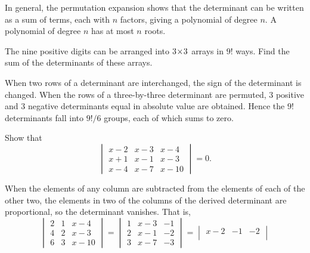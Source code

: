 \begin{exercises}
\begin{answer}
      In general, the permutation expansion shows that
      the determinant can be written as a sum of terms, each
      with \( n \) factors, giving a polynomial of degree $n$.
      A polynomial of degree \( n \) has at most \( n \) roots. 
    \end{answer}
  \puzzle \item 
    The nine positive digits can be arranged into \( 3 \! \times \! 3 \) arrays
    in \( 9! \) ways.
    Find the sum of the determinants of these arrays.
    \cite{MathMag63Q307}
    \begin{answer}
      \answerasgiven
      When two rows of a determinant are interchanged, the sign of the
      determinant is changed.
      When the rows of a three-by-three determinant are permuted, \( 3 \)
      positive and \( 3 \) negative determinants equal in absolute value
      are obtained.
      Hence the \( 9! \) determinants fall into \( 9!/6 \) groups, each of
      which sums to zero.  
    \end{answer}
  \item 
    Show that
    \begin{equation*}
      \begin{vmatrix}
        x-2  &x-3  &x-4  \\
        x+1  &x-1  &x-3  \\
        x-4  &x-7  &x-10
      \end{vmatrix}=0.
    \end{equation*}
    \cite{MathMag63Q237}
    \begin{answer}
      \answerasgiven
      When the elements of any column are subtracted from the elements of
      each of the other two, the elements in two of the columns of the derived
      determinant are proportional, so the determinant vanishes.
      That is,
      \begin{equation*}
        \begin{vmatrix}
          2  &1    &x-4  \\
          4  &2    &x-3  \\
          6  &3    &x-10
        \end{vmatrix}=
        \begin{vmatrix}
          1    &x-3  &-1   \\
          2    &x-1  &-2   \\
          3    &x-7  &-3
        \end{vmatrix}=
        \begin{vmatrix}
          x-2  &-1   &-2   \\

\end{vmatrix}
\end{equation*}
\end{answer}
\end{exercises}
